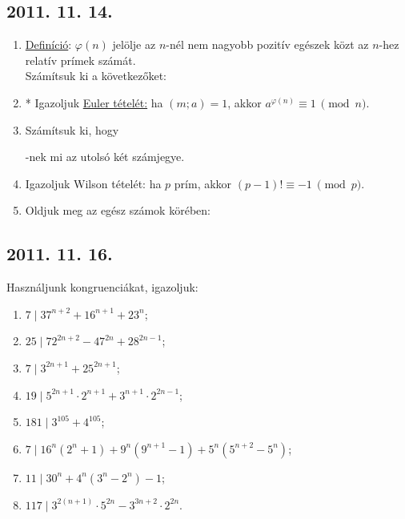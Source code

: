 	\subsection*{2011. 11. 14.}
	\begin{enumerate}
		\item \underline{Definíció}: $\varphi(n)$ jelölje az $n$-nél nem nagyobb pozitív egészek közt az $n$-hez relatív prímek számát.\\
		Számítsuk ki a következőket:
		\item * Igazoljuk \underline{Euler tételét:} ha $(m;a)=1$, akkor $a^{\varphi(n)}\equiv1\ \pmod{n}$.
		\item Számítsuk ki, hogy
		-nek mi az utolsó két számjegye.
		\item Igazoljuk Wilson tételét: ha $p$ prím, akkor $(p-1)!\equiv-1\ \pmod{p}$.
		\item Oldjuk meg az egész számok körében:
	\end{enumerate}
	
	
	\subsection*{2011. 11. 16.}
	Használjunk kongruenciákat, igazoljuk:
	\begin{enumerate}
		\item $7\mid 37^{n+2}+16^{n+1}+23^n$;
		\item $25\mid 72^{2n+2}-47^{2n}+28^{2n-1}$;
		\item $7\mid 3^{2n+1}+25^{2n+1}$;
		\item $19\mid 5^{2n+1}\cdot2^{n+1}+3^{n+1}\cdot2^{2n-1}$;
		\item $181\mid 3^{105}+4^{105}$;
		\item $7\mid 16^n(2^n+1)+9^n(9^{n+1}-1)+5^n(5^{n+2}-5^n)$;
		\item $11\mid 30^n+4^n(3^n-2^n)-1$;
		\item $117\mid 3^{2(n+1)}\cdot5^{2n}-3^{3n+2}\cdot2^{2n}$.
	\end{enumerate}
	

